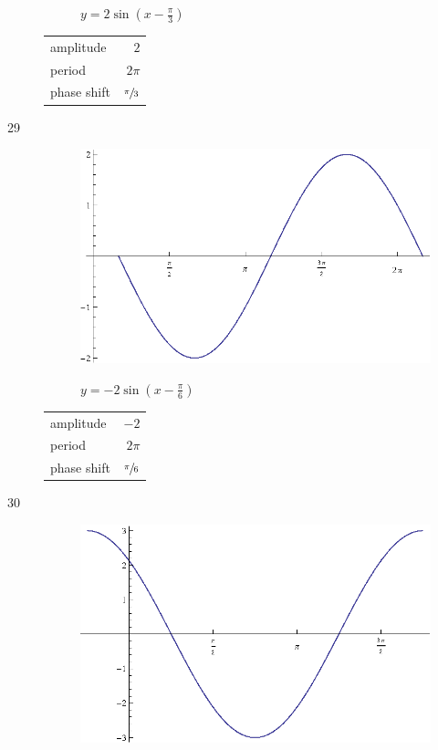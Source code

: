\documentclass{exam}
\begin{document}
\begin{description}
\begin{figure}[H]
          $y = 2 \sin \left( x - \frac{\pi}{3} \right)$
        \end{figure}

        \begin{tabular}[H]{lr}
          \toprule
          amplitude   & $2$ \\
          period      & $2 \pi$ \\
          phase shift & $\sfrac{\pi}{3}$ \\
          \bottomrule
        \end{tabular}

      \item[29]
        \begin{figure}[H]
          \centering
          \includegraphics[scale=0.8]{exercise29.eps}

          $y = - 2 \sin \left( x - \frac{\pi}{6} \right)$
        \end{figure}

        \begin{tabular}[H]{lr}
          \toprule
          amplitude   & $-2$ \\
          period      & $2 \pi$ \\
          phase shift & $\sfrac{\pi}{6}$ \\
          \bottomrule
        \end{tabular}

      \item[30]
        \begin{figure}[H]
          \centering
          \includegraphics[scale=0.8]{exercise30.eps}


\end{figure}
\end{description}
\end{document}
